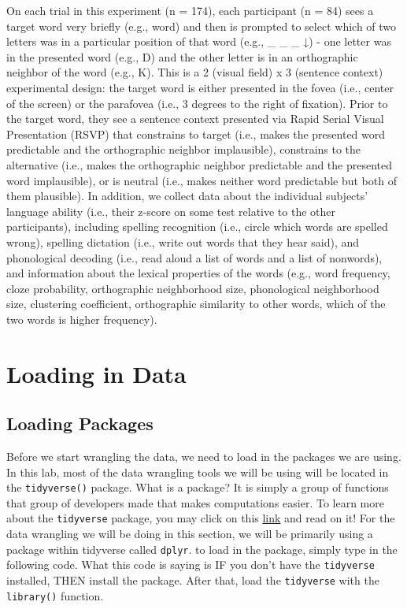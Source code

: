 \documentclass[
]{book}
\begin{document}
On each trial in this experiment (n = 174), each participant (n = 84) sees a target word very briefly (e.g., word) and then is prompted to select which of two letters was in a particular position of that word (e.g., \_ \_ \_ ↓) - one letter was in the presented word (e.g., D) and the other letter is in an orthographic neighbor of the word (e.g., K). This is a 2 (visual field) x 3 (sentence context) experimental design: the target word is either presented in the fovea (i.e., center of the screen) or the parafovea (i.e., 3 degrees to the right of fixation). Prior to the target word, they see a sentence context presented via Rapid Serial Visual Presentation (RSVP) that constrains to target (i.e., makes the presented word predictable and the orthographic neighbor implausible), constrains to the alternative (i.e., makes the orthographic neighbor predictable and the presented word implausible), or is neutral (i.e., makes neither word predictable but both of them plausible). In addition, we collect data about the individual subjects' language ability (i.e., their z-score on some test relative to the other participants), including spelling recognition (i.e., circle which words are spelled wrong), spelling dictation (i.e., write out words that they hear said), and phonological decoding (i.e., read aloud a list of words and a list of nonwords), and information about the lexical properties of the words (e.g., word frequency, cloze probability, orthographic neighborhood size, phonological neighborhood size, clustering coefficient, orthographic similarity to other words, which of the two words is higher frequency).

\hypertarget{loading-in-data}{%
\section{Loading in Data}\label{loading-in-data}}

\hypertarget{loading-packages}{%
\subsection{Loading Packages}\label{loading-packages}}

Before we start wrangling the data, we need to load in the packages we are using. In this lab, most of the data wrangling tools we will be using will be located in the \texttt{tidyverse()} package. What is a package? It is simply a group of functions that group of developers made that makes computations easier. To learn more about the \texttt{tidyverse} package, you may click on this \href{https://www.tidyverse.org/}{link} and read on it! For the data wrangling we will be doing in this section, we will be primarily using a package within tidyverse called \texttt{dplyr}. to load in the package, simply type in the following code. What this code is saying is IF you don't have the \texttt{tidyverse} installed, THEN install the package. After that, load the \texttt{tidyverse} with the \texttt{library()} function.
\end{document}
